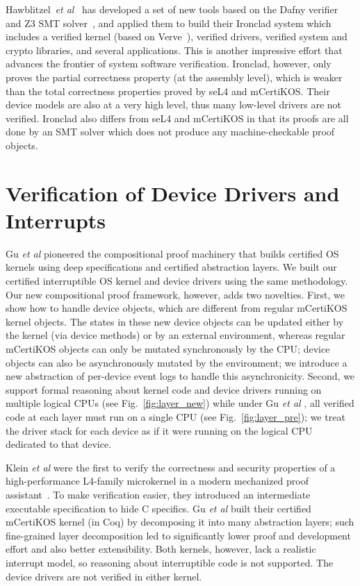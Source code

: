 Hawblitzel~{\em et al}~\cite{ironclad14} has developed a set
of new tools based on the Dafny verifier~\cite{dafny10} and Z3 SMT
solver~\cite{moura08}, and applied them to build their Ironclad system
which includes a verified kernel (based on Verve~\cite{hawblitzel10}),
verified drivers, verified system and crypto libraries, and several
applications.  This is another impressive effort that advances the
frontier of system software verification. Ironclad, however, only
proves the partial correctness property (at the assembly level), which
is weaker than the total correctness properties proved by seL4 and
mCertiKOS. 
Their device models are also at a very high level, thus many low-level
drivers are not verified. Ironclad also differs
from seL4 and mCertiKOS in that its proofs are all done by an SMT solver
which does not produce any machine-checkable proof objects.

\section{Verification of Device Drivers and Interrupts}

Gu {\em et al} \cite{dscal15} pioneered the compositional
proof machinery that
builds certified OS kernels using deep specifications and certified
abstraction layers. We built our certified interruptible OS kernel and
device drivers using the same methodology. Our new compositional proof
framework, however, adds two novelties.
First, we show how to handle
device objects, which are different from regular mCertiKOS kernel
objects. The states in these new device objects can be updated either
by the kernel (via device methods) or by an external environment,
whereas regular mCertiKOS objects can only be mutated synchronously by
the CPU; device objects can also be asynchronously mutated by the
environment; we introduce a new abstraction of per-device event logs
to handle this asynchronicity.
Second, we support formal reasoning about kernel code and device
drivers running on multiple logical CPUs (see
Fig.~\ref{fig:layer_new}) while under Gu {\em et al} \cite{dscal15}, all verified
code at each layer must run on a single CPU (see
Fig.~\ref{fig:layer_pre}); we treat the driver stack for each device
as if it were running on the logical CPU dedicated to that device.

Klein {\em et al} \cite{klein2009sel4} were the first to verify the correctness and
security properties of a high-performance L4-family microkernel in a
modern mechanized proof assistant~\cite{Paulson:Isabelle}.  To make
verification easier, they introduced an intermediate executable
specification to hide C specifics. Gu {\em et al} \cite{dscal15} built their
certified mCertiKOS kernel (in Coq) by decomposing it into many
abstraction layers; such fine-grained layer decomposition led to
significantly lower proof and development effort and also better
extensibility. Both kernels, however, lack a realistic
interrupt model, so reasoning about interruptible code is not
supported. The device drivers are not verified in either kernel.


